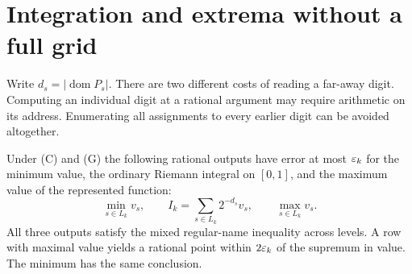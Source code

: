 \section{Integration and extrema without a full grid}
\label{sec:aggregation}
Write $d_s=|\operatorname{dom}P_s|$. There are two different costs of reading a far-away digit. Computing an individual digit at a rational argument may require arithmetic on its address. Enumerating all assignments to every earlier digit can be avoided altogether.

\begin{theorem}\label{thm:agg}
Under (C) and (G) the following rational outputs have error at most $\varepsilon_k$ for the minimum value, the ordinary Riemann integral on $[0,1]$, and the maximum value of the represented function:
\[
       \min_{s\in L_k}v_s,\qquad
       I_k=\sum_{s\in L_k}2^{-d_s}v_s,\qquad
       \max_{s\in L_k}v_s .
\]
All three outputs satisfy the mixed regular-name inequality across levels. A row with maximal value yields a rational point within $2\varepsilon_k$ of the supremum in value. The minimum has the same conclusion.
\end{theorem}
